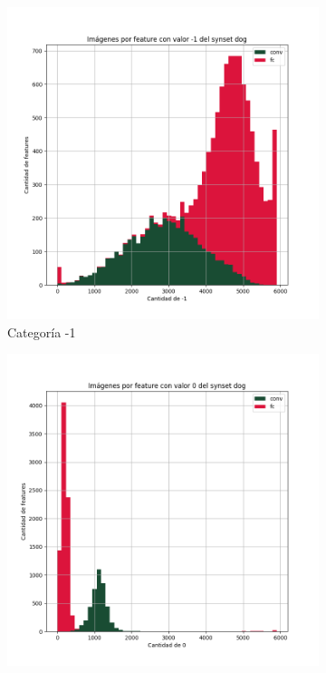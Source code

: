 \documentclass[12,twoside]{TFG-GM}
\theoremstyle{definition}
\theoremstyle{remark}
\begin{document}
\begin{figure}[ht] 
	\centering
	\begin{subfigure}[b]{0.3\textwidth}
		\includegraphics[width=\textwidth] {Images/plots/25/synsets/Images_per_feature_of_-1_category_dogall_layers.png}
		\caption{Categoría -1}
	\end{subfigure}
	\begin{subfigure}[b]{0.3\textwidth}
		\includegraphics[width=\textwidth]  {Images/plots/25/synsets/Images_per_feature_of_0_category_dogall_layers.png}

\end{subfigure}
\end{figure}
\end{document}
